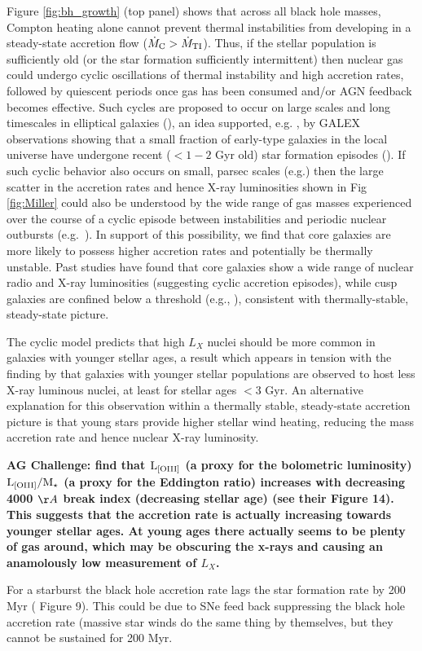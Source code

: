 \documentclass[usenatbib,fleqn]{mn2e}
\begin{document}
Figure \ref{fig:bh_growth} (top panel) shows that across all black
hole masses, Compton heating alone cannot prevent thermal
instabilities from developing in a steady-state accretion flow
($\dot{M}_{\rm C} > \dot{M}_{\rm TI}$).  Thus, if the stellar
population is sufficiently old (or the star formation sufficiently
intermittent) then nuclear gas could undergo cyclic oscillations of
thermal instability and high accretion rates, followed by quiescent
periods once gas has been consumed and/or AGN feedback becomes
effective.  Such cycles are proposed to occur on large scales and long
timescales in elliptical galaxies (\citealt{Ciotti+10}), an idea
supported, e.g. , by GALEX observations showing that a small fraction
of early-type galaxies in the local universe have undergone recent ($<
1-2$ Gyr old) star formation episodes (\citealt{Donas+07}).  If such
cyclic behavior also occurs on small, parsec scales (e.g.) then the
large scatter in the accretion rates and hence X-ray luminosities
shown in Fig \ref{fig:Miller} could also be understood by the wide
range of gas masses experienced over the course of a cyclic episode
between instabilities and periodic nuclear outbursts
(e.g.~\citealt{Ciotti+10}).  In support of this possibility, we find
that core galaxies are more likely to possess higher accretion rates
and potentially be thermally unstable.  Past studies have found that
core galaxies show a wide range of nuclear radio and X-ray
luminosities (suggesting cyclic accretion episodes), while cusp
galaxies are confined below a threshold (e.g., \citealt{Bender+89,
  Pellegrini99, Capetti&Balmaverde05}), consistent with
thermally-stable, steady-state picture.

The cyclic model predicts that high $L_{X}$ nuclei should be more
common in galaxies with younger stellar ages, a result which appears
in tension with the finding by \citet{Pellegrini10} that galaxies with
younger stellar populations are observed to host less X-ray luminous
nuclei, at least for stellar ages $<3$ Gyr.  An alternative
explanation for this observation within a thermally stable,
steady-state accretion picture is that young stars provide higher
stellar wind heating, reducing the mass accretion rate and hence
nuclear X-ray luminosity.  {\bf AG Challenge: \citet{HeckmanBest:2014a}
  find that ${\rm L_{[OIII]}}$ (a proxy for the bolometric luminosity)
  ${\rm L_{[OIII]}/M_\star}$ (a proxy for the Eddington ratio)
  increases with decreasing 4000 $\AA$ break index (decreasing stellar
  age) (see their Figure 14). This suggests that the accretion rate is
  actually increasing towards younger stellar ages. At young ages
  there actually seems to be plenty of gas around, which may be
  obscuring the x-rays and causing an anamolously low measurement of
  $L_X$. 
  
  For a starburst the black hole accretion rate lags the star
  formation rate by 200 Myr (\citet{WildHeckman+:2010a} Figure
  9). This could be due to SNe feed back suppressing the black hole
  accretion rate (massive star winds do the same thing by themselves,
  but they cannot be sustained for 200 Myr. 
}
\end{document}

